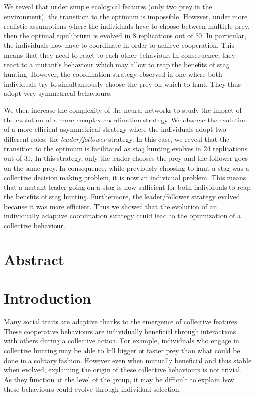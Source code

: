 We reveal that under simple ecological features (only two prey in the environment), the transition to the optimum is impossible. However, under more realistic assumptions where the individuals have to choose between multiple prey, then the optimal equilibrium is evolved in $8$ replications out of $30$. In particular, the individuals now have to coordinate in order to achieve cooperation. This means that they need to react to each other behaviour. In consequence, they react to a mutant's behaviour which may allow to reap the benefits of stag hunting. However, the coordination strategy observed in one where both individuals try to simultaneously choose the prey on which to hunt. They thus adopt very symmetrical behaviours.

We then increase the complexity of the neural networks to study the impact of the evolution of a more complex coordination strategy. We observe the evolution of a more efficient asymmetrical strategy where the individuals adopt two different roles: the \emph{leader/follower} strategy. In this case, we reveal that the transition to the optimum is facilitated as stag hunting evolves in $24$ replications out of $30$. In this strategy, only the leader chooses the prey and the follower goes on the same prey. In consequence, while previously choosing to hunt a stag was a collective decision making problem, it is now an individual problem. This means that a mutant leader going on a stag is now sufficient for both individuals to reap the benefits of stag hunting. Furthermore, the leader/follower strategy evolved because it was more efficient. Thus we showed that the evolution of an individually adaptive coordination strategy could lead to the optimization of a collective behaviour.

\clearpage



\section{Abstract}


\section{Introduction}
  Many social traits are adaptive thanks to the emergence of collective features. These cooperative behaviours are individually beneficial through interactions with others during a collective action. For example, individuals who engage in collective hunting may be able to kill bigger or faster prey than what could be done in a solitary fashion. However even when mutually beneficial and thus stable when evolved, explaining the origin of these collective behaviours is not trivial. As they function at the level of the group, it may be difficult to explain how these behaviours could evolve through individual selection.

